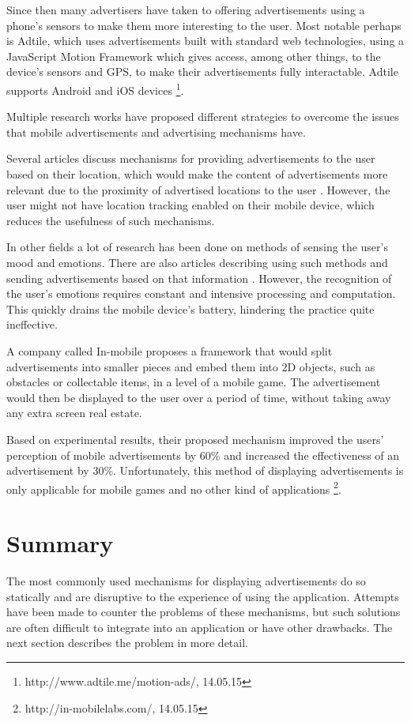 Since then many advertisers have taken to offering advertisements using a phone’s sensors to make them more interesting to the user. Most notable perhaps is Adtile, which uses advertisements built with standard web technologies, using a JavaScript Motion Framework which gives access, among other things, to the device’s sensors and GPS, to make their advertisements fully interactable. Adtile supports Android and iOS devices \footnote[34]{http://www.adtile.me/motion-ads/, 14.05.15}.

Multiple research works have proposed different strategies to overcome the issues that mobile advertisements and advertising mechanisms have.

Several articles discuss mechanisms for providing advertisements to the user based on their location, which would make the content of advertisements more relevant due to the proximity of advertised locations to the user \cite{hristova2004adme}\cite{aalto2004btandwap}. However, the user might not have location tracking enabled on their mobile device, which reduces the usefulness of such mechanisms.

In other fields a lot of research has been done on methods of sensing the user's mood and emotions\cite{geller2014howdoyoufeel}\cite{kiel2004frustration}. There are also articles describing using such methods and sending advertisements based on that information \cite{hristova2004adme}\cite{likamwa2013moodscope}. However, the recognition of the user's emotions requires constant and intensive processing and computation. This quickly drains the mobile device's battery, hindering the practice quite ineffective.

A company called In-mobile proposes a framework that would split advertisements into smaller pieces and embed them into 2D objects, such as obstacles or collectable items, in a level of a mobile game. The advertisement would then be displayed to the user over a period of time, without taking away any extra screen real estate.

Based on experimental results, their proposed mechanism improved the users' perception of mobile advertisements by 60\% and increased the effectiveness of an advertisement by 30\%. Unfortunately, this method of displaying advertisements is only applicable for mobile games and no other kind of applications \footnote[35]{http://in-mobilelabs.com/, 14.05.15}.

\section{Summary}

The most commonly used mechanisms for displaying advertisements do so statically and are disruptive to the experience of using the application. Attempts have been made to counter the problems of these mechanisms, but such solutions are often difficult to integrate into an application or have other drawbacks. The next section describes the problem in more detail.